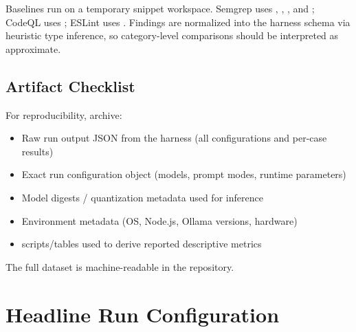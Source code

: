 Baselines run on a temporary snippet workspace. Semgrep uses , , , and ; CodeQL uses ; ESLint uses . Findings are normalized into the harness schema via heuristic type inference, so category-level comparisons should be interpreted as approximate.

\subsection*{Artifact Checklist}

For reproducibility, archive:
\begin{itemize}
  \item Raw run output JSON from the harness (all configurations and per-case results)
  \item Exact run configuration object (models, prompt modes, runtime parameters)
  \item Model digests / quantization metadata used for inference
  \item Environment metadata (OS, Node.js, Ollama versions, hardware)
  \item scripts/tables used to derive reported descriptive metrics
\end{itemize}

The full dataset is machine-readable in the repository.

\section{Headline Run Configuration}
\label{app:run-config}

